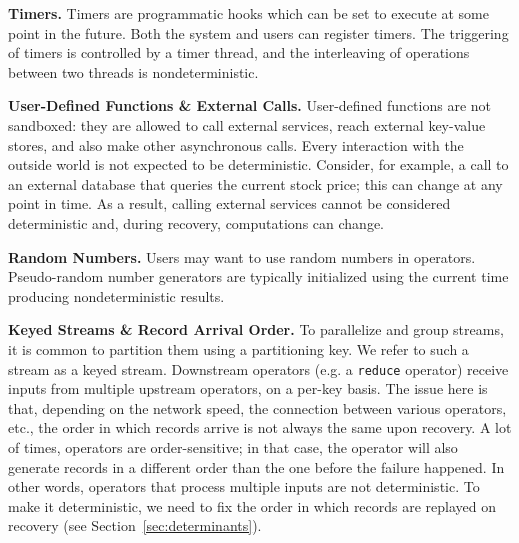 \documentclass[sigconf]{acmart}
\newcommand{\para}[1]{\vspace{1mm}\noindent\textbf{#1.}}
\begin{document}
\para{Timers} Timers are programmatic hooks which can be set to execute at some point in the future. Both the system and users can register timers. The triggering of timers is controlled by a timer thread, and the interleaving of operations between two threads is nondeterministic.




\para{User-Defined Functions \& External Calls} User-defined functions are not sandboxed: they are allowed to call external services, reach external key-value stores, and also make other asynchronous calls. Every interaction with the outside world is not expected to be deterministic. Consider, for example, a call to an external database that queries the current stock price; this can change at any point in time. As a result, calling external services cannot be considered deterministic and, during recovery, computations can change. 

\para{Random Numbers} Users may want to use random numbers in operators. Pseudo-random number generators are typically initialized using the current time producing nondeterministic results.

\para{Keyed Streams \& Record Arrival Order} To parallelize and group streams, it is common to partition them using a partitioning key. We refer to such a stream as a keyed stream. 
Downstream operators (e.g. a \texttt{reduce} operator) receive inputs from multiple upstream operators, on a per-key basis. The issue here is that, depending on the network speed, the connection between various operators, etc., the order in which records arrive is not always the same upon recovery. A lot of times, operators are order-sensitive; in that case, the operator will also generate records in a different order than the one before the failure happened. In other words, operators that process multiple inputs are not deterministic. To make it deterministic, we need to fix the order in which records are replayed on recovery (see Section~\ref{sec:determinants}).
\end{document}
